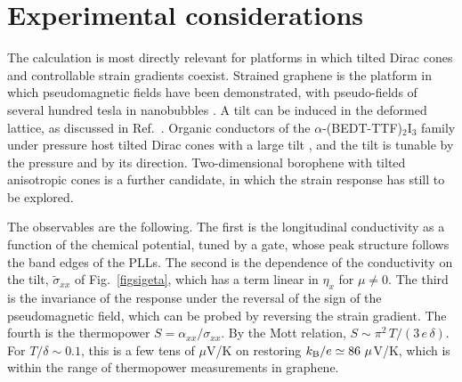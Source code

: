 \documentclass[aps,prb, onecolumn, nofootinbib, citeautoscript,10pt]{revtex4-2}
\newcommand{\red}[1]{{\color{red}#1}}
\begin{document}
\section{Experimental considerations}
\label{secexp}

The calculation is most directly relevant for platforms in which tilted Dirac cones and controllable strain gradients coexist. Strained graphene is the platform in which pseudomagnetic fields have been demonstrated, with pseudo-fields of several hundred tesla in nanobubbles \cite{levy10, graphene-strain-geim, vozmediano10, strain-2d}. A tilt can be induced in the deformed lattice, as discussed in Ref.~\cite{tilted-goerbig}. Organic conductors of the $\alpha$-(BEDT-TTF)$_2$I$_3$ family under pressure host tilted Dirac cones with a large tilt \cite{organic-tilted-dirac}, and the tilt is tunable by the pressure and by its direction. Two-dimensional borophene with tilted anisotropic cones \cite{zhou14} is a further candidate, in which the strain response has still to be explored.

The observables are the following. The first is the longitudinal conductivity as a function of the chemical potential, tuned by a gate, whose peak structure follows the band edges of the PLLs. The second is the dependence of the conductivity on the tilt, \red{$\tilde\sigma_{xx}$} of Fig.~\ref{figsigeta}\red{, which has a term linear in $\eta_x$ for $\mu\neq0$.} \red{The third is the invariance of the response under the reversal of the sign of the pseudomagnetic field, which can be probed by reversing the strain gradient.} The fourth is the thermopower $S=\alpha_{xx}/\sigma_{xx}$. By the Mott relation, $S\sim\pi^2\,T/(3\,e\,\delta)$. For $T/\delta\sim0.1$, this is a few tens of $\mu$V/K on restoring $k_{\rm B}/e\simeq86\ \mu$V/K, which is within the range of thermopower measurements in graphene.
\end{document}
